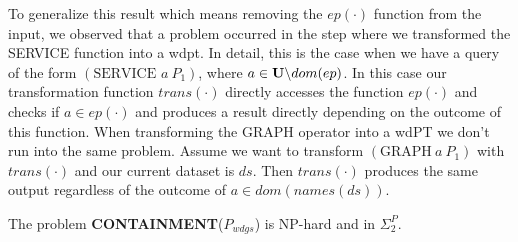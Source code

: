 To generalize this result which means removing the $ep(\cdot)$ function from the
input, we observed that a problem occurred in the step where we transformed the
SERVICE function into a wdpt. 
In detail, this is the case when we have a query of the form $(\mbox{SERVICE }
a \
P_1)$, where $a \in \mathbf{U} \backslash dom(ep)$. In this case our transformation
function $trans(\cdot)$ directly accesses the function $ep(\cdot)$ and checks if $a \in
ep(\cdot)$ and produces a result directly depending on the outcome of this
function. When transforming the GRAPH operator into a wdPT we don't run into the
same problem. Assume we want to transform $(\mbox{GRAPH} \ a \ P_1)$ with $trans(\cdot)$
and our current dataset is $ds$.
Then $trans(\cdot)$ produces the same output regardless of the outcome of $a \in
dom(names(ds))$.
\begin{theorem}
	The problem \textbf{CONTAINMENT}($P_{wdgs}$)  
	is NP-hard and in $\Sigma^P_2$.
\end{theorem}
